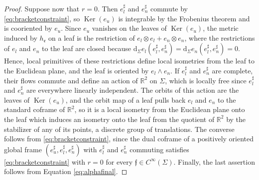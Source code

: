 \documentclass[10pt,reqno,a4paper]{amsart}
\theoremstyle{plain}
\theoremstyle{definition}
\theoremstyle{remark}
\theoremstyle{remark}
\def\dd{\mathrm{d}}
\def\fre{\mathfrak{e}}
\newcommand{\Ker}{\operatorname{Ker}}
\renewcommand{\(}{ (}
\renewcommand{\)}{ )}
\newcommand{\frf}{\mathfrak{f}}
\begin{document}
\begin{proof}
\noindent
Suppose now that $r = 0$. Then $e^{\sharp}_{l}$ and $e^{\sharp}_{n}$ commute by \eqref{eq:bracketconstraint}, so $\Ker(e_u)$ is integrable by the Frobenius theorem and is cooriented by $e_u$. Since $e_u$ vanishes on the leaves of $\Ker(e_u)$, the metric induced by $h_{\fre}$ on a leaf is the restriction of $e_l\otimes e_l + e_n\otimes e_n$, where the restrictions of $e_l$ and $e_n$ to the leaf are closed because $\dd_{\Sigma} e_l (e^{\sharp}_{l},e^{\sharp}_{n}) = \dd_{\Sigma} e_n (e^{\sharp}_{l},e^{\sharp}_{n}) = 0$. Hence, local primitives of these restrictions define local isometries from the leaf to the Euclidean plane, and the leaf is oriented by $e_l\wedge e_n$. If $e^{\sharp}_{l}$ and $e^{\sharp}_{n}$ are complete, their flows commute and define an action of $\mathbb{R}^2$ on $\Sigma$, which is locally free since $e^{\sharp}_{l}$ and $e^{\sharp}_{n}$ are everywhere linearly independent. The orbits of this action are the leaves of $\Ker(e_u)$, and the orbit map of a leaf pulls back $e_l$ and $e_n$ to the standard coframe of $\mathbb{R}^2$, so it is a local isometry from the Euclidean plane onto the leaf which induces an isometry onto the leaf from the quotient of $\mathbb{R}^2$ by the stabilizer of any of its points, a discrete group of translations. The converse follows from \eqref{eq:bracketconstraint}, since the dual coframe of a positively oriented global frame $(e^{\sharp}_{u},e^{\sharp}_{l},e^{\sharp}_{n})$ with $e^{\sharp}_{l}$ and $e^{\sharp}_{n}$ commuting satisfies \eqref{eq:bracketconstraint} with $r=0$ for every $\frf\in C^{\infty}(\Sigma)$. Finally, the last assertion follows from Equation \eqref{eq:alphafinal}.
\end{proof}
\end{document}

